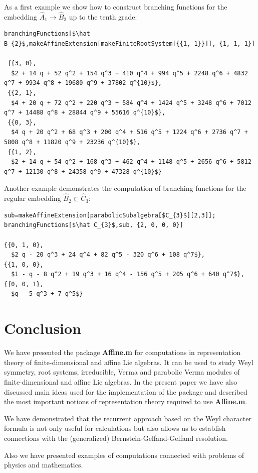 \documentclass[preprint,12pt]{elsarticle}
\begin{document}
As a first example we show how to construct branching functions for the embedding $\hat A_{1}\to \hat B_{2}$ up to the tenth grade:
\begin{lstlisting}[mathescape=true]
branchingFunctions[$\hat B_{2}$,makeAffineExtension[makeFiniteRootSystem[{{1, 1}}]], {1, 1, 1}]

 {{3, 0}, 
  $2 + 14 q + 52 q^2 + 154 q^3 + 410 q^4 + 994 q^5 + 2248 q^6 + 4832 q^7 + 9934 q^8 + 19680 q^9 + 37802 q^{10}$},
 {{2, 1}, 
  $4 + 20 q + 72 q^2 + 220 q^3 + 584 q^4 + 1424 q^5 + 3248 q^6 + 7012 q^7 + 14488 q^8 + 28844 q^9 + 55616 q^{10}$},
 {{0, 3}, 
  $4 q + 20 q^2 + 68 q^3 + 200 q^4 + 516 q^5 + 1224 q^6 + 2736 q^7 + 5808 q^8 + 11820 q^9 + 23236 q^{10}$},
 {{1, 2}, 
  $2 + 14 q + 54 q^2 + 168 q^3 + 462 q^4 + 1148 q^5 + 2656 q^6 + 5812 q^7 + 12130 q^8 + 24358 q^9 + 47328 q^{10}$}
\end{lstlisting}

Another example demonstrates the computation of branching functions for the regular embedding $\hat B_{2}\subset \hat C_{3}$:
\begin{lstlisting}[mathescape=true]
sub=makeAffineExtension[parabolicSubalgebra[$C_{3}$][2,3]];
branchingFunctions[$\hat C_{3}$,sub, {2, 0, 0, 0}]

{{0, 1, 0}, 
  $2 q - 20 q^3 + 24 q^4 + 82 q^5 - 320 q^6 + 108 q^7$}, 
{{1, 0, 0}, 
  $1 - q - 8 q^2 + 19 q^3 + 16 q^4 - 156 q^5 + 205 q^6 + 640 q^7$}, 
{{0, 0, 1}, 
  $q - 5 q^3 + 7 q^5$}
\end{lstlisting}

\section{Conclusion}
\label{sec:conclusion}
We have presented the package {\bf Affine.m} for computations in representation theory of finite-dimensional and affine Lie algebras. It can be used to study Weyl symmetry, root systems, irreducible, Verma and parabolic Verma modules of finite-dimensional and affine Lie algebras.  In the present paper we have also discussed main ideas used for the implementation of the package and described the most important notions of representation theory required to use {\bf Affine.m}. 

We have demonstrated that the recurrent approach based on the Weyl character formula is not only useful for calculations but also allows us to establish connections with the (generalized) Bernstein-Gelfand-Gelfand resolution. 

Also we have presented examples of computations connected with problems of physics and mathematics. 
\end{document}
